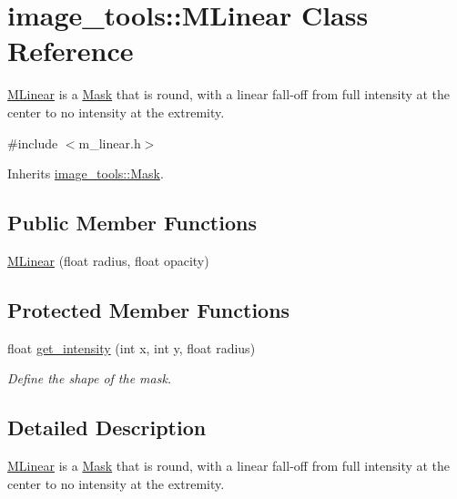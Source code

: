 \hypertarget{classimage__tools_1_1MLinear}{}\section{image\+\_\+tools\+:\+:M\+Linear Class Reference}
\label{classimage__tools_1_1MLinear}


\hyperlink{classimage__tools_1_1MLinear}{M\+Linear} is a \hyperlink{classimage__tools_1_1Mask}{Mask} that is round, with a linear fall-\/off from full intensity at the center to no intensity at the extremity.  




{\ttfamily \#include $<$m\+\_\+linear.\+h$>$}



Inherits \hyperlink{classimage__tools_1_1Mask}{image\+\_\+tools\+::\+Mask}.

\subsection*{Public Member Functions}
\begin{DoxyCompactItemize}
\item 
\hyperlink{classimage__tools_1_1MLinear_af84be097b93aaef6785f0ddb8a5af847}{M\+Linear} (float radius, float opacity)
\end{DoxyCompactItemize}
\subsection*{Protected Member Functions}
\begin{DoxyCompactItemize}
\item 
float \hyperlink{classimage__tools_1_1MLinear_aeb72a91e48a0981a1e8f3754a17e174d}{get\+\_\+intensity} (int x, int y, float radius)
\begin{DoxyCompactList}\small\item\em Define the shape of the mask. \end{DoxyCompactList}\end{DoxyCompactItemize}


\subsection{Detailed Description}
\hyperlink{classimage__tools_1_1MLinear}{M\+Linear} is a \hyperlink{classimage__tools_1_1Mask}{Mask} that is round, with a linear fall-\/off from full intensity at the center to no intensity at the extremity. 

